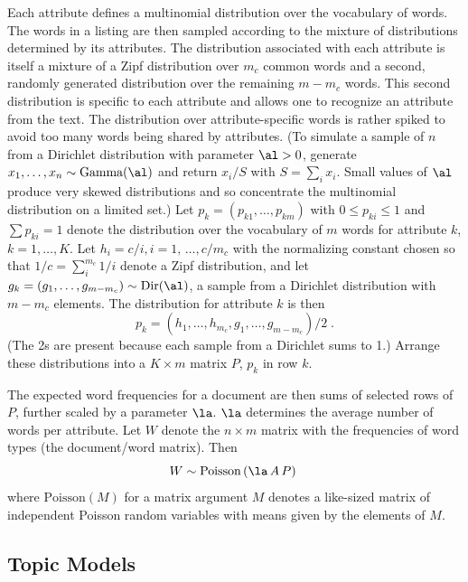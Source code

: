 \documentclass[12pt]{article}
\begin{document}
Each attribute defines a multinomial distribution over the vocabulary of words. The words in a listing are then sampled according to the mixture of  distributions determined by its attributes. The distribution associated with each attribute is itself a mixture of a Zipf distribution over $m_c$ common words and a second, randomly generated distribution over the remaining $m-m_c$ words.   This second distribution is specific to each attribute and allows one to recognize an attribute from the text.   The distribution over attribute-specific words is rather spiked to avoid too many words being shared by attributes.  (To simulate a sample of $n$ from a Dirichlet distribution with parameter $\al>0$, generate $x_1,\ldots,x_n \sim \mbox{Gamma}(\al)$ and return $x_i/S$ with $S = \sum_i x_i$.  Small values of $\al$ produce very skewed distributions and so concentrate the multinomial distribution on a limited set.)  Let $p_{k} = (p_{k1},\ldots,p_{km})$ with $0 \le p_{ki} \le 1$ and $\sum p_{ki} = 1$ denote the distribution over the vocabulary of $m$  words for attribute $k$, $k = 1,\ldots,K$.  Let $h_i = c/i, i = 1,\, \ldots, c/m_c$ with the normalizing constant chosen so that $1/c = \sum_i^{m_c} 1/i$ denote a Zipf distribution, and let $g_k = (g_1,\ldots,g_{m-m_c}) \sim \mbox{Dir}(\al)$, a sample from a Dirichlet distribution with $m-m_c$ elements.  The distribution for attribute $k$ is then
\begin{equation}
  p_k = ( h_1, \ldots, h_{m_c},  g_1,\ldots,g_{m-m_c})/2 \;.
\end{equation}
(The 2s are present because each sample from a Dirichlet sums to 1.)  Arrange these distributions into a $K \times m$ matrix $P$, $p_k$ in row $k$.  

The expected word frequencies for a document are then sums of selected rows of $P$, further scaled by a parameter $\la$.  $\la$ determines the average number of words per attribute.  Let $W$ denote the $n \times m$ matrix with the frequencies of word types (the document/word matrix).  Then
\begin{equation}
	W \sim \mbox{Poisson} \left(\la \, A \, P \right) \;
\end{equation}
where $\mbox{Poisson}(M)$ for a matrix argument $M$ denotes a like-sized matrix of independent Poisson random variables with means given by the elements of $M$.




\subsection {Topic Models}  %
\end{document}
